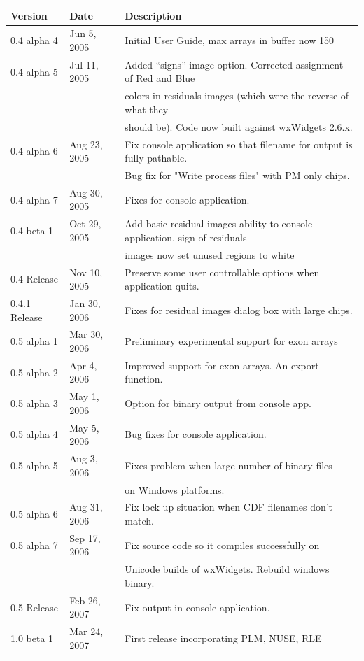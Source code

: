 \documentclass[11pt]{report}
\begin{document}
{\small \begin{tabular}{lll} \hline
Version	& Date& 	 Description \\\hline
0.4 alpha 4& Jun 5, 2005 & Initial User Guide, max arrays in buffer now 150 \\
0.4 alpha 5& Jul 11, 2005 & Added ``signs'' image option. Corrected assignment of Red and Blue \\
&& colors in residuals images (which were the reverse of what they \\
&& should be). Code now built against wxWidgets 2.6.x. \\
0.4 alpha 6& Aug 23, 2005 & Fix console application so that filename for output is fully pathable. \\
&& Bug fix for "Write process files" with PM only chips. \\ 
0.4 alpha 7 & Aug 30, 2005 &	Fixes for console application. \\
0.4 beta 1 & Oct 29, 2005 & Add basic residual images ability to console application. sign of residuals \\
&& images now set unused regions to white\\
0.4 Release & Nov 10, 2005 &	Preserve some user controllable options when application quits. \\
0.4.1 Release & Jan 30, 2006 &	Fixes for residual images dialog box with large chips. \\
0.5 alpha 1 & Mar 30, 2006 & Preliminary experimental support for exon arrays \\
0.5 alpha 2 & Apr 4, 2006 & Improved support for exon arrays. An export function. \\
0.5 alpha 3 & May 1, 2006 & Option for binary output from console app. \\
0.5 alpha 4 & May 5, 2006 & Bug fixes for console application. \\
0.5 alpha 5 & Aug 3, 2006 & Fixes problem when large number of binary files\\
& &  on Windows platforms. \\
0.5 alpha 6 & Aug 31, 2006 & Fix lock up situation when CDF filenames don't match.\\
0.5 alpha 7 & Sep 17, 2006 & Fix source code so it compiles successfully on \\
& & Unicode builds of wxWidgets. Rebuild windows binary. \\ 
0.5 Release & Feb 26, 2007 &  Fix output in console application.\\ 
1.0 beta 1 & Mar 24, 2007 & First release incorporating PLM, NUSE, RLE \\ 

\end{tabular}}
\end{document}
